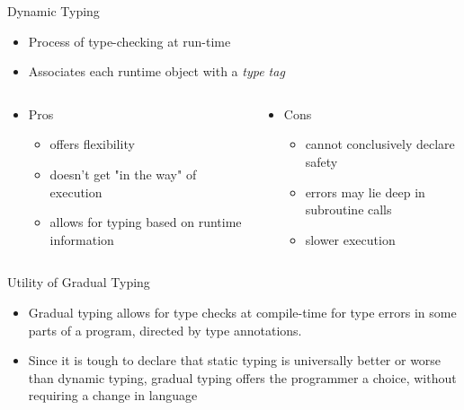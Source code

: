 \documentclass[presentation]{beamer}
\begin{document}
\begin{frame}[label={sec:org0806ef4}]{Dynamic Typing}
\begin{itemize}
\item Process of type-checking at run-time
\item Associates each runtime object with a \emph{type tag}
\end{itemize}


\begin{columns}
\begin{column}{0.5\columnwidth}
\begin{itemize}
\item Pros
\begin{itemize}
\item offers flexibility
\item doesn't get "in the way" of execution
\item allows for typing based on runtime information
\end{itemize}
\end{itemize}
\end{column}

\begin{column}{0.5\columnwidth}
\begin{itemize}
\item Cons
\begin{itemize}
\item cannot conclusively declare safety
\item errors may lie deep in subroutine calls
\item slower execution
\end{itemize}
\end{itemize}
\end{column}
\end{columns}
\end{frame}

\begin{frame}[label={sec:orge735448}]{Utility of Gradual Typing}
\begin{itemize}
\item Gradual typing allows for type checks at compile-time for type errors in some parts of a program, directed by type annotations.
\item Since it is tough to declare that static typing is universally better or worse than dynamic typing, gradual typing offers the programmer a choice, without requiring a change in language
\end{itemize}
\end{frame}
\end{document}
